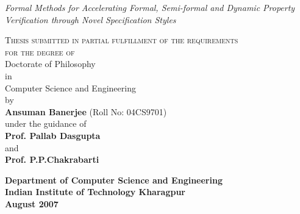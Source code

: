 \begin{titlepage}
\begin {center}
\vspace*{0.4cm}


\centering
{\huge\sf \emph{Formal Methods for Accelerating Formal,
    Semi-formal and Dynamic Property Verification
    through Novel Specification Styles}
}
%

\vspace {.6in}
{\scshape  Thesis submitted in partial fulfillment of the requirements}\\
{\scshape for the degree of}\\
\sf
\vspace {0.3in}
{\large Doctorate of Philosophy}\\

{in}\\
{\large Computer Science and Engineering}\\
\vspace {.2in}
\large
{by}\\
\vspace{.1in}
{\bf Ansuman Banerjee} (Roll No: 04CS9701) \\
\vspace {.1in}
{under the guidance of}\\
\vspace{.2in}
{\bf Prof. Pallab Dasgupta} \\
\vspace {.1in}
{and} \\
\vspace {.1in}
{\bf Prof. P.P.Chakrabarti} \\
\vspace{.1in}
\begin{figure}[htbp]
{\centering {} \par}
\end{figure}

{
{\bf Department of Computer Science and Engineering}\\
{\bf Indian Institute of Technology Kharagpur}\\
{\bf August 2007}
}
\end {center}
\end{titlepage}

